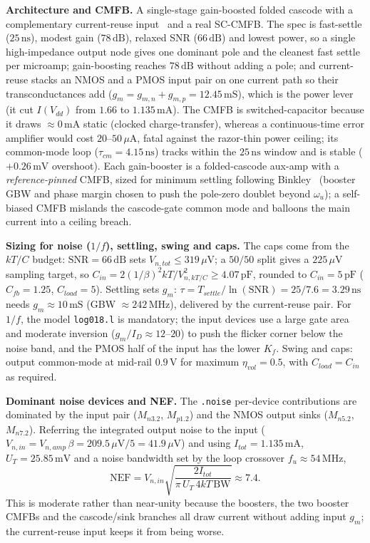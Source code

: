\documentclass[11pt]{article}
\begin{document}
\medskip
\noindent\textbf{Architecture and CMFB.} A single-stage gain-boosted folded cascode with a
complementary current-reuse input~\cite{ryu2007} and a real SC-CMFB. The spec is fast-settle
($25\,\mathrm{ns}$), modest gain ($78\,\mathrm{dB}$), relaxed SNR ($66\,\mathrm{dB}$) and
lowest power, so a single high-impedance output node gives one dominant pole and the
cleanest fast settle per microamp; gain-boosting reaches $78\,\mathrm{dB}$ without adding a
pole; and current-reuse stacks an NMOS and a PMOS input pair on one current path so their
transconductances add ($g_m=g_{m,n}+g_{m,p}=12.45\,\mathrm{mS}$), which is the power lever
(it cut $I(V_{dd})$ from $1.66$ to $1.135\,\mathrm{mA}$). The CMFB is switched-capacitor
because it draws $\approx0\,\mathrm{mA}$ static (clocked charge-transfer), whereas a
continuous-time error amplifier would cost $20$--$50\,\mu\mathrm{A}$, fatal against the
razor-thin power ceiling; its common-mode loop ($\tau_{cm}=4.15\,\mathrm{ns}$) tracks within
the $25\,\mathrm{ns}$ window and is stable ($+0.26\,\mathrm{mV}$ overshoot). Each gain-booster
is a folded-cascode aux-amp with a \emph{reference-pinned} CMFB, sized for minimum settling
following Binkley~\cite{binkley2010} (booster GBW and phase margin chosen to push the
pole-zero doublet beyond $\omega_u$); a self-biased CMFB mislands the cascode-gate common
mode and balloons the main current into a ceiling breach.

\medskip
\noindent\textbf{Sizing for noise ($1/f$), settling, swing and caps.} The caps come from the
$kT/C$ budget: $\mathrm{SNR}=66\,\mathrm{dB}$ sets $V_{n,tot}\le319\,\mu\mathrm{V}$; a
$50/50$ split gives a $225\,\mu\mathrm{V}$ sampling target, so
$C_{in}=2(1/\beta)^2kT/V_{n,kT/C}^2\ge4.07\,\mathrm{pF}$, rounded to $C_{in}=5\,\mathrm{pF}$
($C_{fb}=1.25$, $C_{load}=5$). Settling sets $g_m$: $\tau=T_{settle}/\ln(\mathrm{SNR})
=25/7.6=3.29\,\mathrm{ns}$ needs $g_m\approx10\,\mathrm{mS}$ (GBW $\approx242\,\mathrm{MHz}$),
delivered by the current-reuse pair. For $1/f$, the model \texttt{log018.l} is mandatory; the
input devices use a large gate area and moderate inversion ($g_m/I_D\approx12$--$20$) to push
the flicker corner below the noise band, and the PMOS half of the input has the lower $K_f$.
Swing and caps: output common-mode at mid-rail $0.9\,\mathrm{V}$ for maximum
$\eta_{vol}=0.5$, with $C_{load}=C_{in}$ as required.

\medskip
\noindent\textbf{Dominant noise devices and NEF.} The \texttt{.noise} per-device
contributions are dominated by the input pair ($M_{n3.2}$, $M_{p1.2}$) and the NMOS output
sinks ($M_{n5.2}$, $M_{n7.2}$). Referring the integrated output noise to the input
($V_{n,in}=V_{n,amp}\,\beta=209.5\,\mu\mathrm{V}/5=41.9\,\mu\mathrm{V}$) and using
$I_{tot}=1.135\,\mathrm{mA}$, $U_T=25.85\,\mathrm{mV}$ and a noise bandwidth set by the
loop crossover $f_u\approx54\,\mathrm{MHz}$,
\[
\mathrm{NEF}=V_{n,in}\sqrt{\frac{2I_{tot}}{\pi\,U_T\,4kT\,\mathrm{BW}}}\approx7.4.
\]
This is moderate rather than near-unity because the boosters, the two booster CMFBs and the
cascode/sink branches all draw current without adding input $g_m$; the current-reuse input
keeps it from being worse.
\end{document}
